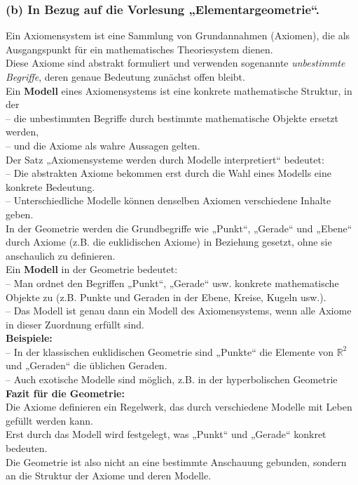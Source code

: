 \documentclass[12pt,a4paper]{article}
\begin{document}
\newpage
\subsubsection*{(b) In Bezug auf die Vorlesung „Elementargeometrie“.}
Ein Axiomensystem ist eine Sammlung von Grundannahmen (Axiomen), die als Ausgangspunkt für ein mathematisches Theoriesystem dienen. \\ 
Diese Axiome sind abstrakt formuliert und verwenden sogenannte \emph{unbestimmte Begriffe}, deren genaue Bedeutung zunächst offen bleibt. \\ 
Ein \textbf{Modell} eines Axiomensystems ist eine konkrete mathematische Struktur, in der \\ 
\hspace*{1em} -- die unbestimmten Begriffe durch bestimmte mathematische Objekte ersetzt werden, \\ 
\hspace*{1em} -- und die Axiome als wahre Aussagen gelten. \\ Der Satz „Axiomensysteme werden durch Modelle interpretiert“ bedeutet: \\ 
\hspace*{1em} -- Die abstrakten Axiome bekommen erst durch die Wahl eines Modells eine konkrete Bedeutung. \\ 
\hspace*{1em} -- Unterschiedliche Modelle können denselben Axiomen verschiedene Inhalte geben. \\ 
In der Geometrie werden die Grundbegriffe wie „Punkt“, „Gerade“ und „Ebene“ durch Axiome (z.B. die euklidischen Axiome) in Beziehung gesetzt, ohne sie anschaulich zu definieren. \\ 
Ein \textbf{Modell} in der Geometrie bedeutet: \\ 
\hspace*{1em} -- Man ordnet den Begriffen „Punkt“, „Gerade“ usw. konkrete mathematische Objekte zu (z.B. Punkte und Geraden in der Ebene, Kreise, Kugeln usw.). \\ 
\hspace*{1em} -- Das Modell ist genau dann ein Modell des Axiomensystems, wenn alle Axiome in dieser Zuordnung erfüllt sind. \\ 
\textbf{Beispiele:} \\ 
\hspace*{1em} -- In der klassischen euklidischen Geometrie sind „Punkte“ die Elemente von $\mathbb{R}^2$ und „Geraden“ die üblichen Geraden. \\ 
\hspace*{1em} -- Auch exotische Modelle sind möglich, z.B. in der hyperbolischen Geometrie \\ 
\textbf{Fazit für die Geometrie:} \\ 
Die Axiome definieren ein Regelwerk, das durch verschiedene Modelle mit Leben gefüllt werden kann. \\ 
Erst durch das Modell wird festgelegt, was „Punkt“ und „Gerade“ konkret bedeuten. \\ 
Die Geometrie ist also nicht an eine bestimmte Anschauung gebunden, sondern an die Struktur der Axiome und deren Modelle. \\ 
\end{document}
